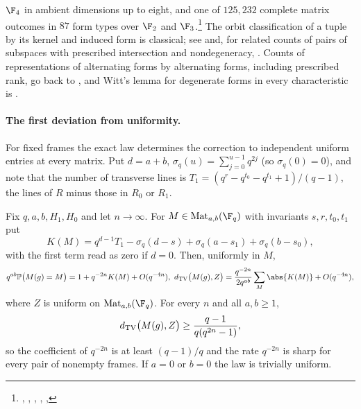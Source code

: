 $\F_4$ in ambient dimensions up to eight, and one of $125{,}232$ complete
matrix outcomes in $87$ form types over $\F_2$ and
$\F_3$.\footnote{\raggedright{},
,
,
,
,
}
The orbit classification of a tuple by its kernel and induced form is
classical; see \cite[Lemma~2.6]{GuralnickLarsenTiep2024Character} and, for
related counts of pairs of subspaces with prescribed intersection and
nondegeneracy, \cite{DeBoeckVandeVoorde2024Anzahl}. Counts of
representations of alternating forms by alternating forms, including
prescribed rank, go back to \cite{Wan1995Representations,WeiZhang2001Number},
and Witt's lemma for degenerate forms in every characteristic is
\cite[Theorem~3.4]{SprehnWahl2020Forms}.

\paragraph{The first deviation from uniformity.}
For fixed frames the exact law determines the correction to independent
uniform entries at every matrix. Put $d=a+b$, $\sigma_q(u)=\sum_{j=0}^{u-1}q^{2j}$
(so $\sigma_q(0)=0$), and note that the number of transverse lines is
$T_1=(q^r-q^{t_0}-q^{t_1}+1)/(q-1)$, the lines of $R$ minus those in $R_0$ or
$R_1$.

\begin{theorem}\label{spn:thm:first-correction}
Fix $q,a,b,H_1,H_0$ and let $n\to\infty$. For $M\in\spnMat_{a,b}(\F_q)$ with
invariants $s,r,t_0,t_1$ put
\[
 K(M)=q^{d-1}T_1-\sigma_q(d-s)+\sigma_q(a-s_1)+\sigma_q(b-s_0),
\]
with the first term read as zero if $d=0$. Then, uniformly in $M$,
\begin{gather*}
 q^{ab}\spnP\bigl(M(g)=M\bigr)=1+q^{-2n}K(M)+O(q^{-4n}),\
 \spnTV\bigl(M(g),Z\bigr)=\frac{q^{-2n}}{2q^{ab}}\sum_M\abs{K(M)}+O(q^{-4n}),
\end{gather*}
where $Z$ is uniform on $\spnMat_{a,b}(\F_q)$. For every $n$ and all $a,b\ge1$,
\begin{equation}\label{spn:eq:scalar-lower}
 d_{\mathrm{TV}}\bigl(M(g),Z\bigr)\ge\frac{q-1}{q(q^{2n}-1)} ,
\end{equation}
so the coefficient of $q^{-2n}$ is at least $(q-1)/q$ and the rate $q^{-2n}$
is sharp for every pair of nonempty frames. If $a=0$ or $b=0$ the law is
trivially uniform.
\end{theorem}

